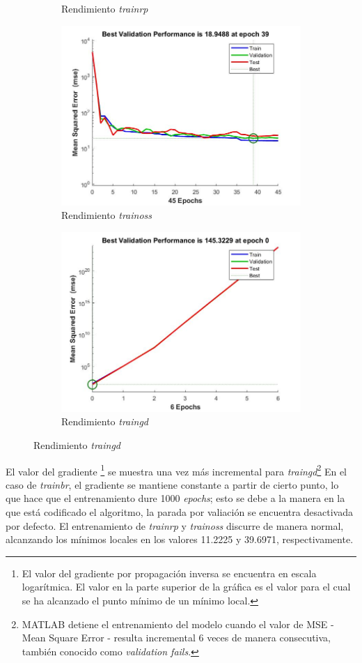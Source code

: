 \documentclass{article}
\begin{document}
\begin{figure}[H]
\begin{subfigure}{0.4\textwidth}
  \caption{Rendimiento \textit{trainrp}}
 \end{subfigure}
 \begin{subfigure}{0.4\textwidth}
  \includegraphics[width=0.8\linewidth]{../images/I_ex3_performance_bodyfat_dataset_trainoss.jpg}
  \caption{Rendimiento \textit{trainoss}}
 \end{subfigure}
 \begin{subfigure}{0.4\textwidth}
  \includegraphics[width=0.8\linewidth]{../images/I_ex3_performance_bodyfat_dataset_traingd.jpg}
  \caption{Rendimiento \textit{traingd}}
 \end{subfigure}
\end{figure}

El valor del gradiente \footnote{El valor del gradiente por propagación inversa
se encuentra en escala logarítmica. El valor en la parte superior de la gráfica
es el valor para el cual se ha alcanzado el punto mínimo de un mínimo local.} se 
muestra una vez más incremental para \textit{traingd}\footnote{MATLAB detiene el 
entrenamiento del modelo cuando el valor de MSE - Mean Square Error - resulta 
incremental 6 veces de manera consecutiva, también conocido como 
\textit{validation fails}.} En el caso de \textit{trainbr}, el gradiente se 
mantiene constante a partir de cierto punto, lo que hace que el entrenamiento 
dure 1000 \textit{epochs}; esto se debe a la manera en la que está codificado el
algoritmo, la parada por valiación se encuentra desactivada por defecto. El 
entrenamiento de \textit{trainrp} y \textit{trainoss} discurre de manera normal, 
alcanzando los mínimos locales en los valores 11.2225 y 39.6971, respectivamente.
\end{document}
